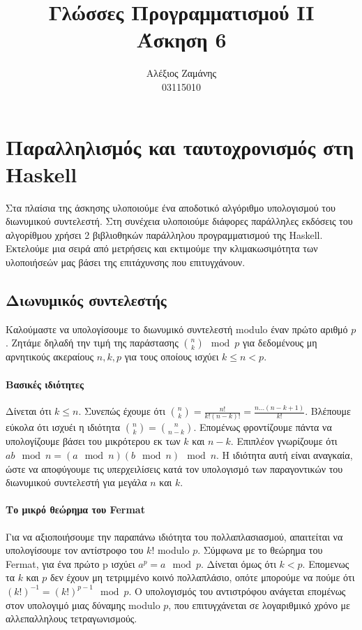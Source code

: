 \documentclass[titlepage]{article}
\begin{document}
\title{Γλώσσες Προγραμματισμού II\\
    Άσκηση 6}
\author{Αλέξιος Ζαμάνης\\
    03115010}

\maketitle

\section*{Παραλληλισμός και ταυτοχρονισμός στη Haskell}

Στα πλαίσια της άσκησης υλοποιούμε ένα αποδοτικό αλγόριθμο υπολογισμού του διωνυμικού συντελεστή. Στη συνέχεια υλοποιούμε διάφορες παράλληλες εκδόσεις του αλγορίθμου χρήσει 2 βιβλιοθηκών παράλληλου προγραμματισμού της Haskell. Εκτελούμε μια σειρά από μετρήσεις και εκτιμούμε την κλιμακωσιμότητα των υλοποιήσεών μας βάσει της επιτάχυνσης που επιτυγχάνουν.

\subsection*{Διωνυμικός συντελεστής}

Καλούμαστε να υπολογίσουμε το διωνυμικό συντελεστή modulo έναν πρώτο αριθμό $p$. Ζητάμε δηλαδή την τιμή της παράστασης ${n\choose k}\mod p$ για δεδομένους μη αρνητικούς ακεραίους $n, k, p$ για τους οποίους ισχύει $k\leq n<p$.

\paragraph{Βασικές ιδιότητες}

Δίνεται ότι $k\leq n$. Συνεπώς έχουμε ότι ${n\choose k}=\frac{n!}{k!(n-k)!}=\frac{n\dots(n-k+1)}{k!}$. Βλέπουμε εύκολα ότι ισχυέι η ιδιότητα ${n\choose k}={n\choose n-k}$. Επομένως φροντίζουμε πάντα να υπολογίζουμε βάσει του μικρότερου εκ των $k$ και $n-k$. Επιπλέον γνωρίζουμε ότι $ab\mod n=(a\mod n)(b\mod n)\mod n$. Η ιδιότητα αυτή είναι αναγκαία, ώστε να αποφύγουμε τις υπερχειλίσεις κατά τον υπολογισμό των παραγοντικών του διωνυμικού συντελεστή για μεγάλα $n$ και $k$.

\paragraph{Το μικρό θεώρημα του Fermat}

Για να αξιοποιήσουμε την παραπάνω ιδιότητα του πολλαπλασιασμού, απαιτείται να υπολογίσουμε τον αντίστροφο του $k!$ modulo $p$. Σύμφωνα με το θεώρημα του Fermat, για ένα πρώτο p ισχύει $a^p=a\mod p$. Δίνεται όμως ότι $k<p$. Επομενως τα $k$ και $p$ δεν έχουν μη τετριμμένο κοινό πολλαπλάσιο, οπότε μπορούμε να πούμε ότι $(k!)^{-1}=(k!)^{p-1}\mod p$. Ο υπολογισμός του αντιστρόφου ανάγεται επομένως στον υπολογιμό μιας δύναμης modulo $p$, που επιτυγχάνεται σε λογαριθμικό χρόνο με αλλεπαλληλους τετραγωνισμούς.
\end{document}
